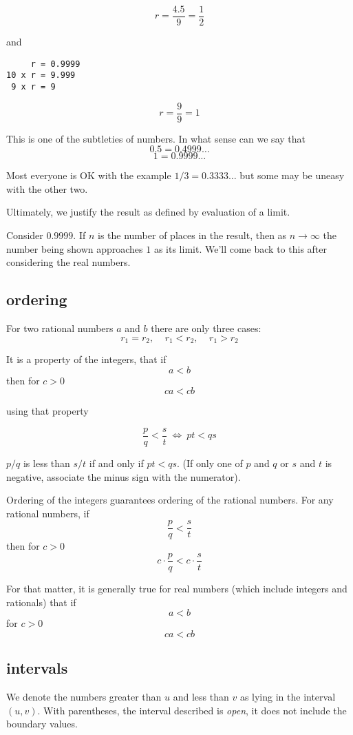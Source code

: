 \documentclass[11pt, oneside]{article}
\begin{document}
\[ r = \frac{4.5}{9} = \frac{1}{2} \]

and

\begin{verbatim}
     r = 0.9999
10 x r = 9.999
 9 x r = 9
\end{verbatim}

\[ r = \frac{9}{9} = 1 \]

This is one of the subtleties of numbers.  In what sense can we say that 
\[ 0.5 = 0.4999 \dots \]
\[ 1 = 0.9999 \dots \]

Most everyone is OK with the example $1/3 = 0.3333 \dots$ but some may be uneasy with the other two.

Ultimately, we justify the result as defined by evaluation of a limit.  

Consider $0.9999$.  If $n$ is the number of places in the result, then as $n \rightarrow \infty$ the number being shown approaches $1$ as its limit.  We'll come back to this after considering the real numbers.

\subsection*{ordering}
For two rational numbers $a$ and $b$ there are only three cases:  
\[ r_1 = r_2, \ \ \ \ \ r_1 < r_2, \ \ \ \ \ r_1 > r_2 \]

It is a property of the integers, that if
\[ a < b \]
then for $c > 0$
\[ ca < cb \]

using that property

\[ \frac{p}{q} < \frac{s}{t} \ \iff \ pt < qs \]

$p/q$ is less than $s/t$ if and only if $pt < qs$.  (If only one of $p$ and $q$ or $s$ and $t$ is negative, associate the minus sign with the numerator).

Ordering of the integers guarantees ordering of the rational numbers.  For any rational numbers, if
\[ \frac{p}{q} < \frac{s}{t} \]
then for $c > 0$
\[ c \cdot \frac{p}{q} < c \cdot \frac{s}{t} \]

For that matter, it is generally true for real numbers (which include integers and rationals) that if
\[ a < b \]
for $c > 0$
\[ ca < cb \]

\subsection*{intervals}
We denote the numbers greater than $u$ and less than $v$ as lying in the interval $(u,v)$.  With parentheses, the interval described is \emph{open}, it does not include the boundary values.
\end{document}
